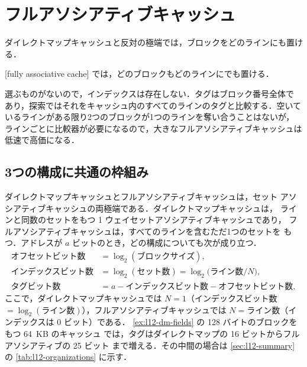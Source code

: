 \documentclass[../main.tex]{subfiles}
\begin{document}
\section{フルアソシアティブキャッシュ}
\label{sec:l12-fa}

ダイレクトマップキャッシュと反対の極端では，ブロックをどのラインにも置ける．

\begin{definition}[フルアソシアティブキャッシュ]
  [fully associative cache]%
  では，どのブロックもどのラインにでも置ける．
\end{definition}

選ぶものがないので，インデックスは存在しない．タグはブロック番号全体で
あり，探索ではそれをキャッシュ内のすべてのラインのタグと比較する．空いて
いるラインがある限り2つのブロックが1つのラインを奪い合うことはないが，
ラインごとに比較器が必要になるので，大きなフルアソシアティブキャッシュは
低速で高価になる．

\subsection{3つの構成に共通の枠組み}

ダイレクトマップキャッシュとフルアソシアティブキャッシュは，セット
アソシアティブキャッシュの両極端である．ダイレクトマップキャッシュは，
ラインと同数のセットをもつ 1 ウェイセットアソシアティブキャッシュであり，
フルアソシアティブキャッシュは，すべてのラインを含むただ1つのセットを
もつ．アドレスが $a$ ビットのとき，どの構成についても次が成り立つ．
\begin{equation}
  \begin{aligned}
    \text{オフセットビット数} &= \log_2(\text{ブロックサイズ}), \\
    \text{インデックスビット数}  &= \log_2(\text{セット数})
                        = \log_2\bigl(\text{ライン数}/N\bigr), \\
    \text{タグビット数}    &= a - \text{インデックスビット数} - \text{オフセットビット数} ,
  \end{aligned}
  \label{eq:l12-fields}
\end{equation}
ここで，ダイレクトマップキャッシュでは $N=1$（インデックスビット数
$= \log_2(\text{ライン数})$），フルアソシアティブキャッシュでは
$N = \text{ライン数}$（インデックスは 0 ビット）である．
\cref{ex:l12-dm-fields} の 128 バイトのブロックをもつ 64~KB のキャッシュ
では，タグはダイレクトマップの 16 ビットからフルアソシアティブの 25 ビット
まで増える．その中間の場合は \cref{sec:l12-summary} の
\cref{tab:l12-organizations} に示す．
\end{document}
